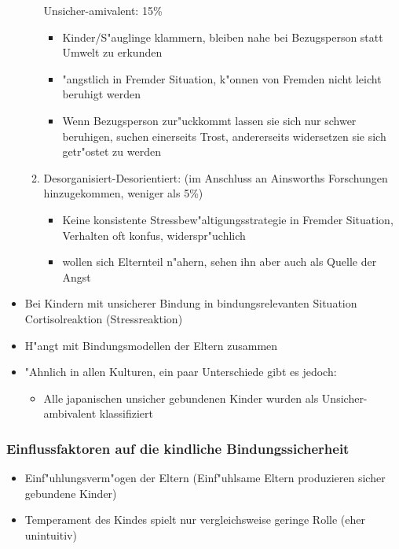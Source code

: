 \begin{itemize}
\begin{enumerate}
				Unsicher-amivalent: 15\%
				\begin{itemize}
					\item
						Kinder/S"auglinge klammern, bleiben nahe bei Bezugsperson statt Umwelt zu erkunden
					\item
						"angstlich in Fremder Situation, k"onnen von Fremden nicht leicht beruhigt werden
					\item
						Wenn Bezugsperson zur"uckkommt lassen sie sich nur schwer beruhigen, suchen einerseits Trost, andererseits widersetzen sie sich getr"ostet zu werden
				\end{itemize}
			\item
				Desorganisiert-Desorientiert: (im Anschluss an Ainsworths Forschungen hinzugekommen, weniger als 5\%)
				\begin{itemize}
					\item
						Keine konsistente Stressbew"altigungsstrategie in Fremder Situation, Verhalten oft konfus, widerspr"uchlich
					\item
						wollen sich Elternteil n"ahern, sehen ihn aber auch als Quelle der Angst
				\end{itemize}
		\end{enumerate}
	\item
		Bei Kindern mit unsicherer Bindung in bindungsrelevanten Situation Cortisolreaktion (Stressreaktion)
	\item
		H"angt mit Bindungsmodellen der Eltern zusammen
	\item
		"Ahnlich in allen Kulturen, ein paar Unterschiede gibt es jedoch:
		\begin{itemize}
			\item
				Alle japanischen unsicher gebundenen Kinder wurden als Unsicher-ambivalent klassifiziert
		\end{itemize}
\end{itemize}


\subsubsection{Einflussfaktoren auf die kindliche Bindungssicherheit}
\begin{itemize}
	\item
		Einf"uhlungsverm"ogen der Eltern (Einf"uhlsame Eltern produzieren sicher gebundene Kinder)
	\item
		Temperament des Kindes spielt nur vergleichsweise geringe Rolle (eher unintuitiv)
\end{itemize}

